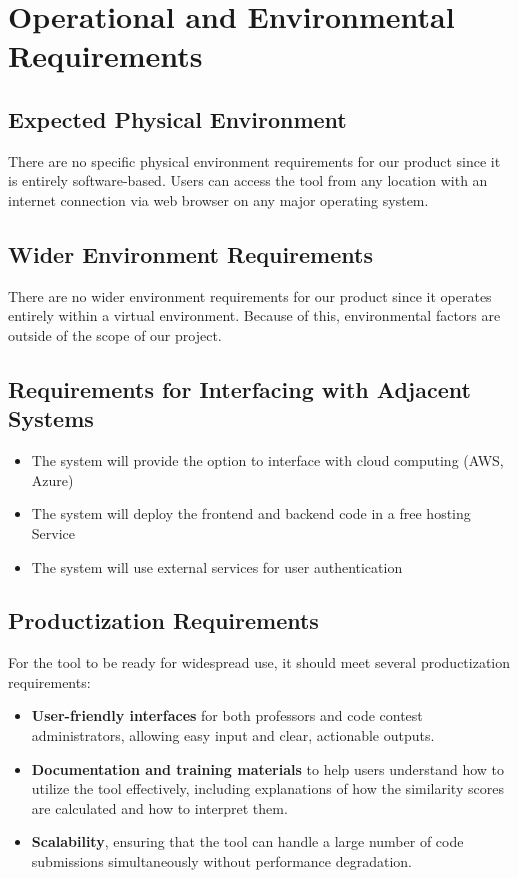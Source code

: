 \documentclass[12pt]{article}
\begin{document}
\section{Operational and Environmental Requirements}
\subsection{Expected Physical Environment}
There are no specific physical environment requirements for our product since it is entirely software-based.
Users can access the tool from any location with an internet connection via web browser on any major operating system.

\subsection{Wider Environment Requirements}
There are no wider environment requirements for our product since it operates entirely within a virtual environment.
Because of this, environmental factors are outside of the scope of our project.

\subsection{Requirements for Interfacing with Adjacent Systems}
\begin{itemize}
    \item The system will provide the option to interface with cloud computing (AWS, Azure) 
    \item The system will deploy the frontend and backend code in a free hosting Service
    \item The system will use external services for user authentication 
\end{itemize}
\subsection{Productization Requirements}
For the tool to be ready for widespread use, it should meet several productization requirements:
\begin{itemize}
    \item \textbf{User-friendly interfaces} for both professors and code contest administrators, allowing easy input and clear, actionable outputs.
    \item \textbf{Documentation and training materials} to help users understand how to utilize the tool effectively, including explanations of how the similarity scores are calculated and how to interpret them.
    \item \textbf{Scalability}, ensuring that the tool can handle a large number of code submissions simultaneously without performance degradation.
\end{itemize}
\end{document}
